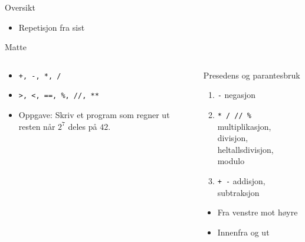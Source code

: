 \documentclass[screen, aspectratio=169]{beamer}
\begin{document}
\begin{frame}{Oversikt}
	\begin{itemize}
		\item Repetisjon fra sist
	\end{itemize}
\end{frame}

\begin{frame}[fragile]{Matte}
	\begin{columns}
		\begin{column}{.5\textwidth}
			\begin{itemize}
				\item \lstinline|+, -, *, /|
				\item \lstinline|>, <, ==, %, //, **|
				\vspace{2em}
				\item<2-> Oppgave: Skriv et program som regner ut resten når $2^7$ deles på $42$.
			\end{itemize}
		\end{column}
		\begin{column}{.4\textwidth}
			\footnotesize
			\begin{block}{\small Presedens og parantesbruk}
				\begin{enumerate}
					\item \lstinline|-| \hfill negasjon
					\item \lstinline|* / // %| \hfill multiplikasjon, divisjon, \\\hfill heltallsdivisjon, modulo
					\item \lstinline|+ -| \hfill addisjon, subtraksjon
				\end{enumerate}
				\begin{itemize}
					\item Fra venstre mot høyre
					\item Innenfra og ut
				\end{itemize}
			\end{block}
		\end{column}
	\end{columns}
\end{frame}
\end{document}
